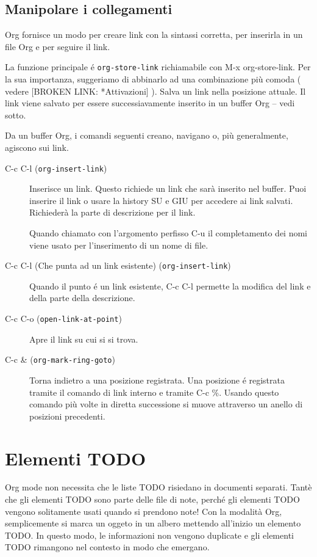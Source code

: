 \documentclass[11pt]{article}
\begin{document}
\subsection*{Manipolare i collegamenti}
\label{sec:org728b7ac}
Org fornisce un modo per creare link con la sintassi corretta, per
inserirla in un file Org e per seguire il link.

La funzione principale é \texttt{org-store-link} richiamabile con M-x org-store-link. Per la sua importanza, suggeriamo di abbinarlo ad
una combinazione più comoda ( vedere [BROKEN LINK: *Attivazioni] ). Salva un link
nella posizione attuale. Il link viene salvato per essere
successiavamente inserito in un buffer Org -- vedi sotto.

Da un buffer Org, i comandi seguenti creano, navigano o, più
generalmente, agiscono sui link.

\begin{description}
\item[{C-c C-l (\texttt{org-insert-link})}] Inserisce un link. Questo richiede un link che sarà inserito nel
buffer. Puoi inserire il link o usare la history SU e
GIU per accedere ai link salvati. Richiederà la parte di
descrizione per il link.

Quando chiamato con l'argomento perfisso C-u il
completamento dei nomi viene usato per l'inserimento di un nome di
file.

\item[{C-c C-l (Che punta ad un link esistente) (\texttt{org-insert-link})}] Quando il punto é un link esistente, C-c C-l permette la
modifica del link e della parte della descrizione.

\item[{C-c C-o (\texttt{open-link-at-point})}] Apre il link su cui si si trova.

\item[{C-c \& (\texttt{org-mark-ring-goto})}] Torna indietro a una posizione registrata. Una posizione é
registrata tramite il comando di link interno e tramite C-c \%. Usando questo comando più volte in diretta successione si
muove attraverso un anello di posizioni precedenti.
\end{description}

\section{Elementi TODO}
\label{sec:org309cf1d}
Org mode non necessita che le liste TODO risiedano in documenti
separati. Tantè che gli elementi TODO sono parte delle file di note,
perché gli elementi TODO vengono solitamente usati quando si prendono
note! Con la modalità Org, semplicemente si marca un oggeto in un
albero mettendo all'inizio un elemento TODO. In questo modo, le
informazioni non vengono duplicate e gli elementi TODO rimangono nel
contesto in modo che emergano.
\end{document}
